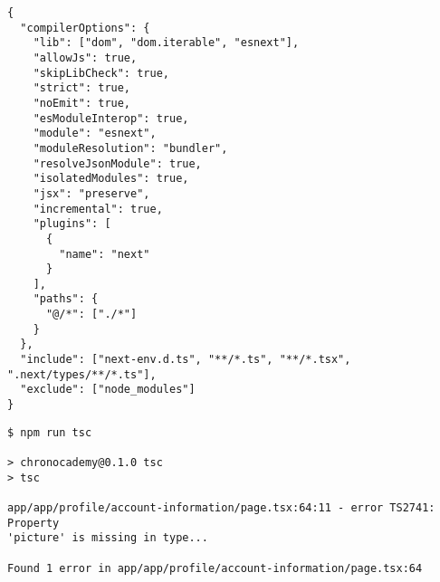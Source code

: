 \begin{verbatim}
{
  "compilerOptions": {
    "lib": ["dom", "dom.iterable", "esnext"],
    "allowJs": true,
    "skipLibCheck": true,
    "strict": true,
    "noEmit": true,
    "esModuleInterop": true,
    "module": "esnext",
    "moduleResolution": "bundler",
    "resolveJsonModule": true,
    "isolatedModules": true,
    "jsx": "preserve",
    "incremental": true,
    "plugins": [
      {
        "name": "next"
      }
    ],
    "paths": {
      "@/*": ["./*"]
    }
  },
  "include": ["next-env.d.ts", "**/*.ts", "**/*.tsx", ".next/types/**/*.ts"],
  "exclude": ["node_modules"]
}
\end{verbatim}

\begin{verbatim}
$ npm run tsc

> chronocademy@0.1.0 tsc
> tsc

app/app/profile/account-information/page.tsx:64:11 - error TS2741: Property
'picture' is missing in type...

Found 1 error in app/app/profile/account-information/page.tsx:64
\end{verbatim}
